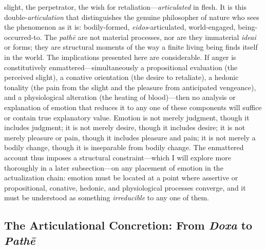 slight, the perpetrator, the wish for retaliation---\textit{articulated} in flesh. It is this double-\textit{articulation} that distinguishes the genuine philosopher of nature who sees the phenomenon as it is: bodily-formed, \textit{eidos}-articulated, world-engaged, being-occurred-to. The \textit{pathē} are not material processes, nor are they immaterial \textit{ideai} or forms; they are structural moments of the way a finite living being finds itself in the world. The implications presented here are considerable. If anger is constitutively enmattered---simultaneously a propositional evaluation (the perceived slight), a conative orientation (the desire to retaliate), a hedonic tonality (the pain from the slight and the pleasure from anticipated vengeance), and a physiological alteration (the heating of blood)---then no analysis or explanation of emotion that reduces it to any one of these components will suffice or contain true explanatory value. Emotion is not merely judgment, though it includes judgment; it is not merely desire, though it includes desire; it is not merely pleasure or pain, though it includes pleasure and pain; it is not merely a bodily change, though it is inseparable from bodily change. The enmattered account thus imposes a structural constraint---which I will explore more thoroughly in a later subsection---on any placement of emotion in the actualization chain: emotion must be located at a point where assertive or propositional, conative, hedonic, and physiological processes converge, and it must be understood as something \textit{irreducible} to any one of them.

\subsection{The Articulational Concretion: From \textit{Doxa} to \textit{Pathē}}

